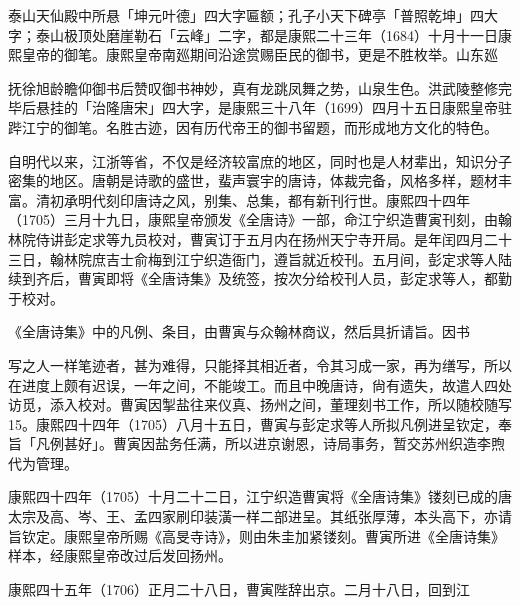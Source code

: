 泰山天仙殿中所悬「坤元叶德」四大字匾额；孔子小天下碑亭「普照乾坤」四大字；泰山极顶处磨崖勒石「云峰」二字，都是康熙二十三年（1684）十月十一日康熙皇帝的御笔。康熙皇帝南廵期间沿途赏赐臣民的御书，更是不胜枚举。山东廵


\noindent 抚徐旭龄瞻仰御书后赞叹御书神妙，真有龙跳凤舞之势，山泉生色。洪武陵整修完毕后悬挂的「治隆唐宋」四大字，是康熙三十八年（1699）四月十五日康熙皇帝驻跸江宁的御笔。名胜古迹，因有历代帝王的御书留题，而形成地方文化的特色。


自明代以来，江浙等省，不仅是经济较富庶的地区，同时也是人材辈出，知识分子密集的地区。唐朝是诗歌的盛世，蜚声寰宇的唐诗，体裁完备，风格多样，题材丰富。清初承明代刻印唐诗之风，别集、总集，都有新刊行世。康熙四十四年（1705）三月十九日，康熙皇帝颁发《全唐诗》一部，命江宁织造曹寅刊刻，由翰林院侍讲彭定求等九员校对，曹寅订于五月内在扬州天宁寺开局。是年闰四月二十三日，翰林院庶吉士俞梅到江宁织造衙门，遵旨就近校刊。五月间，彭定求等人陆续到齐后，曹寅即将《全唐诗集》及统签，按次分给校刊人员，彭定求等人，都勤于校对。

\begin{BookQuote}
《全唐诗集》中的凡例、条目，由曹寅与众翰林商议，然后具折请旨。因书
\end{BookQuote}

写之人一样笔迹者，甚为难得，只能择其相近者，令其习成一家，再为缮写，所以在进度上颇有迟误，一年之间，不能竣工。而且中晚唐诗，尙有遗失，故遣人四处访觅，添入校对。曹寅因掣盐往来仪真、扬州之间，董理刻书工作，所以随校随写15。康熙四十四年（1705）八月十五日，曹寅与彭定求等人所拟凡例进呈钦定，奉旨「凡例甚好」。曹寅因盐务任满，所以进京谢恩，诗局事务，暂交苏州织造李煦代为管理。

康熙四十四年（1705）十月二十二日，江宁织造曹寅将《全唐诗集》镂刻已成的唐太宗及高、岑、王、孟四家刷印装潢一样二部进呈。其纸张厚薄，本头高下，亦请旨钦定。康熙皇帝所赐《高旻寺诗》，则由朱圭加紧镂刻。曹寅所进《全唐诗集》样本，经康熙皇帝改过后发回扬州。

康熙四十五年（1706）正月二十八日，曹寅陛辞出京。二月十八日，回到江

\vfill
\begin{BookNotes}
\end{BookNotes}


